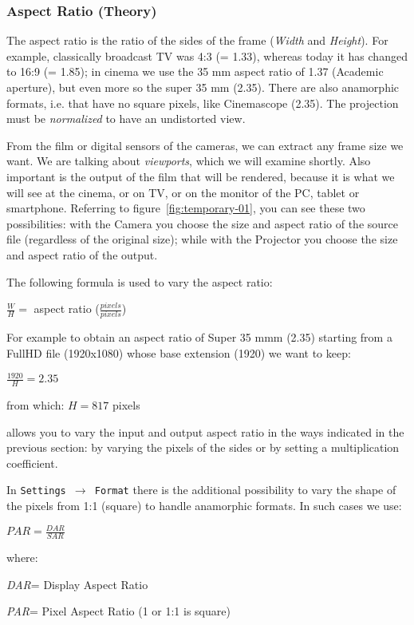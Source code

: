 \subsubsection*{Aspect Ratio (Theory)}%
\label{ssub:aspect_ratio_theory}

The aspect ratio is the ratio of the sides of the frame (\textit{Width} and \textit{Height}). For example, classically broadcast TV was 4:3 (= 1.33), whereas today it has changed to 16:9 (= 1.85); in cinema we use the 35 mm aspect ratio of 1.37 (Academic aperture), but even more so the super 35 mm (2.35). There are also anamorphic formats, i.e. that have no square pixels, like Cinemascope (2.35). The projection must be \textit{normalized} to have an undistorted view.


From the film or digital sensors of the cameras, we can extract any frame size we want. We are talking about \textit{viewports}, which we will examine shortly. Also important is the output of the film that will be rendered, because it is what we will see at the cinema, or on TV, or on the monitor of the PC, tablet or smartphone. Referring to figure~\ref{fig:temporary-01}, you can see these two possibilities: with the Camera you choose the size and aspect ratio of the source file (regardless of the original size); while with the Projector you choose the size and aspect ratio of the output.

The following formula is used to vary the aspect ratio:

\qquad $\frac{W}{H} =$ aspect ratio ($\frac{pixels}{pixels}$)

For example to obtain an aspect ratio of Super 35 mmm (2.35) starting from a FullHD file (1920x1080) whose base extension (1920) we want to keep:

\qquad $\frac{1920}{H} = 2.35$

from which: $H = 817$ pixels

\CGG{} allows you to vary the input and output aspect ratio in the ways indicated in the previous section: by varying the pixels of the sides or by setting a multiplication coefficient.

In \texttt{Settings $\rightarrow$ Format} there is the additional possibility to vary the shape of the pixels from 1:1 (square) to handle anamorphic formats. In such cases we use:

\qquad $PAR=\frac{DAR}{SAR}$

where:

\textit{DAR}= Display Aspect Ratio

\textit{PAR}= Pixel Aspect Ratio (1 or 1:1 is square)

